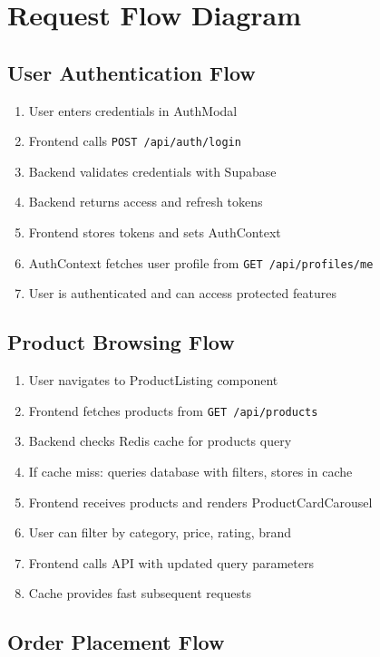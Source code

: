 \documentclass[12pt,a4paper]{report}
\begin{document}
\section{Request Flow Diagram}

\subsection{User Authentication Flow}

\begin{enumerate}
    \item User enters credentials in AuthModal
    \item Frontend calls \texttt{POST /api/auth/login}
    \item Backend validates credentials with Supabase
    \item Backend returns access and refresh tokens
    \item Frontend stores tokens and sets AuthContext
    \item AuthContext fetches user profile from \texttt{GET /api/profiles/me}
    \item User is authenticated and can access protected features
\end{enumerate}

\subsection{Product Browsing Flow}

\begin{enumerate}
    \item User navigates to ProductListing component
    \item Frontend fetches products from \texttt{GET /api/products}
    \item Backend checks Redis cache for products query
    \item If cache miss: queries database with filters, stores in cache
    \item Frontend receives products and renders ProductCardCarousel
    \item User can filter by category, price, rating, brand
    \item Frontend calls API with updated query parameters
    \item Cache provides fast subsequent requests
\end{enumerate}

\subsection{Order Placement Flow}
\end{document}

